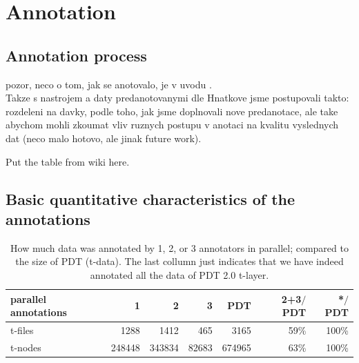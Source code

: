 
\chapter{Annotation}
\label{sec:annot}

\section{Annotation process}
\label{sec:annot:how}
\todo pozor, neco o tom, jak se anotovalo, je v uvodu . \\
Takze s nastrojem a daty predanotovanymi dle Hnatkove jsme postupovali takto: rozdeleni na davky, podle toho, jak jsme doplnovali nove predanotace, ale take abychom mohli zkoumat vliv ruznych postupu v anotaci na kvalitu vyslednych dat (neco malo hotovo, ale jinak future work). 

Put the table from wiki here.





\section{Basic quantitative characteristics of the annotations}
\label{sec:annot:what}

\begin{table}[htdp]
\begin{tabular}{l|r|r|r|r|r|r}
 parallel annotations  & 1    & 2    & 3   & PDT    & 2+3$/$PDT & *$/$PDT \\
 \hline
 t-files & 1288   & 1412   & 465   & 3165   & 59\%        & 100\% \\
 t-nodes & 248448 & 343834 & 82683 & 674965 & 63\%        & 100\% \\
\end{tabular}
\caption{How much data was annotated by 1, 2, or 3 annotators in parallel; compared to the size of PDT (t-data). The last collumn just indicates that we have indeed annotated all the data of PDT 2.0 t-layer.}
\label{tab:parallel-anot}
\end{table}%






